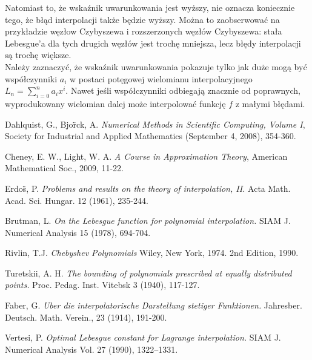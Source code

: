\documentclass{article}
\begin{document}
Natomiast to, że wskaźnik uwarunkowania jest wyższy, nie oznacza koniecznie tego, że błąd interpolacji także będzie wyższy. Można to zaobserwować na przykładzie węzłow Czybyszewa i rozszerzonych węzłów Czybyszewa: stała Lebesgue'a dla tych drugich węzłów jest trochę mniejsza, lecz błędy interpolacji są trochę większe. \\ Należy zaznaczyć, że wskaźnik uwarunkowania pokazuje tylko jak duże mogą być współczynniki $a_i$ w postaci potęgowej wielomianu interpolacyjnego $L_n = \sum_{i=0}^n a_i x^i$. Nawet jeśli współczynniki odbiegają znacznie od poprawnych, wyprodukowany wielomian dalej może interpolować funkcję $f$ z małymi błędami.
\begin{thebibliography}{9} 

Dahlquist, G., Bjo\"rck, A.
\emph{Numerical Methods in Scientific Computing, Volume I},
Society for Industrial and Applied Mathematics (September 4, 2008), 354-360.

Cheney, E. W., Light, W. A.
\emph{A Course in Approximation Theory},
American Mathematical Soc., 2009, 11-22.

Erdo\"s, P. 
\emph{Problems and results on the theory of interpolation, II.}
Acta Math. Acad. Sci. 
Hungar. 12 (1961), 235-244.

Brutman, L.
\emph{On the Lebesgue function for polynomial interpolation.}
SIAM J. Numerical Analysis 15 (1978), 694-704.

Rivlin, T.J.
\emph{Chebyshev Polynomials}
Wiley, New York, 1974. 2nd Edition, 1990.

Turetskii, A. H.
\emph{The bounding of polynomials prescribed at equally distributed points.}
Proc. Pedag. Inst. Vitebsk 3 (1940), 117-127.

Faber, G.
\emph{Uber die interpolatorische Darstellung stetiger Funktionen.}
Jahresber. Deutsch. Math. Verein., 23 (1914), 191-200.

Vertesi, P.
\emph{Optimal Lebesgue constant for Lagrange interpolation.}
SIAM J. Numerical Analysis Vol. 27 (1990), 1322–1331.

\end{thebibliography}
\end{document}
